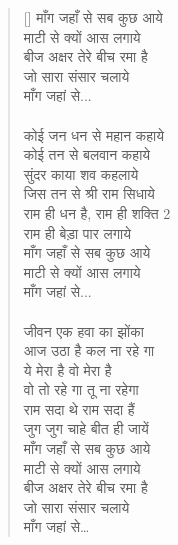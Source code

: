 \begin{verse}[\versewidth]\texthindi{
माँग जहाँ से सब कुछ आये\\
माटी से क्यों आस लगाये\\
बीज अक्षर तेरे बीच रमा है\\
जो सारा संसार चलाये\\
माँग जहां से...\\
\\
कोई जन धन से महान कहाये\\
कोई तन से बलवान कहाये\\
सुंदर काया शव कहलाये\\
जिस तन से श्री राम सिधाये\\
राम ही धन है, राम ही शक्ति 2\\
राम ही बेड़ा पार लगाये\\
माँग जहाँ से सब कुछ आये\\
माटी से क्यों आस लगाये\\
माँग जहां से...\\
\\
जीवन एक हवा का झोंका\\
आज उठा है कल ना रहे गा\\
ये मेरा है वो मेरा है\\
वो तो रहे गा तू ना रहेगा\\
राम सदा थे राम सदा हैं\\
जुग जुग चाहे बीत ही जायें\\
माँग जहाँ से सब कुछ आये\\
माटी से क्यों आस लगाये\\
बीज अक्षर तेरे बीच रमा है\\
जो सारा संसार चलाये\\
माँग जहां से…
}
\end{verse}

